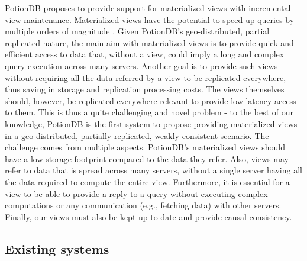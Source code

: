 PotionDB proposes to provide support for materialized views with incremental view maintenance.
Materialized views have the potential to speed up queries by multiple orders of magnitude \cite{partView, effMaintenance, lazyMaintenance}.
Given PotionDB's geo-distributed, partial replicated nature, the main aim with materialized views is to provide quick and efficient access to data that, without a view, could imply a long and complex query execution across many servers.
Another goal is to provide such views without requiring all the data referred by a view to be replicated everywhere, thus saving in storage and replication processing costs.
The views themselves should, however, be replicated everywhere relevant to provide low latency access to them.
This is thus a quite challenging and novel problem - to the best of our knowledge, PotionDB is the first system to propose providing materialized views in a geo-distributed, partially replicated, weakly consistent scenario.
The challenge comes from multiple aspects.
PotionDB's materialized views should have a low storage footprint compared to the data they refer.
Also, views may refer to data that is spread across many servers, without a single server having all the data required to compute the entire view.
Furthermore, it is essential for a view to be able to provide a reply to a query without executing complex computations or any communication (e.g., fetching data) with other servers.
Finally, our views must also be kept up-to-date and provide causal consistency.

\subsection{Existing systems}
\label{subsec:existingSystems}



